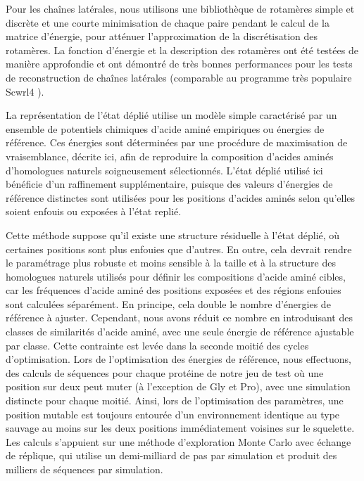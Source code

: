 Pour les chaînes latérales, nous utilisons une bibliothèque de rotamères simple et discrète et une courte minimisation de chaque paire pendant le calcul de la matrice d'énergie, pour atténuer l'approximation de la discrétisation des rotamères. La fonction d'énergie et la description des rotamères ont été testées de manière approfondie et ont démontré de très bonnes performances pour les tests de reconstruction de chaînes latérales \cite{Gaillard16} (comparable au programme très populaire Scwrl4 \cite{Krivov09}).

La représentation de l'état déplié utilise un modèle simple caractérisé par un ensemble de potentiels chimiques d'acide aminé empiriques ou énergies de référence. Ces énergies sont déterminées par une procédure de maximisation de vraisemblance, décrite ici, afin de reproduire la composition d'acides aminés d'homologues naturels soigneusement sélectionnés. L'état déplié utilisé ici bénéficie d'un raffinement supplémentaire, puisque des valeurs d'énergies de référence distinctes sont utilisées pour les positions d'acides aminés selon qu'elles soient enfouis ou exposées à l'état replié.  

Cette méthode suppose qu'il existe une structure résiduelle à l'état déplié, où certaines positions sont plus enfouies que d'autres. En outre, cela devrait rendre le paramétrage plus robuste et moins sensible à la taille et à la structure des homologues naturels utilisés pour définir les compositions d'acide aminé cibles, car les fréquences d'acide aminé des positions exposées et des régions enfouies sont calculées séparément. En principe, cela double le nombre d'énergies de référence à ajuster. Cependant, nous avons réduit ce nombre en introduisant des classes de similarités d'acide aminé, avec une seule énergie de référence ajustable par classe. Cette contrainte est levée dans la seconde moitié des cycles d'optimisation. Lors de l'optimisation des énergies de référence, nous effectuons, des calculs de séquences pour chaque protéine de notre jeu de test où une position sur deux peut muter (à l'exception de Gly et Pro), avec une simulation distincte pour chaque moitié. Ainsi, lors de l'optimisation des paramètres, une position mutable est toujours entourée d'un environnement identique au type sauvage au moins sur les deux positions immédiatement voisines sur le squelette. Les calculs s'appuient sur une méthode d'exploration Monte Carlo avec échange de réplique, qui utilise un demi-milliard de pas par simulation et produit des milliers de séquences par simulation.

